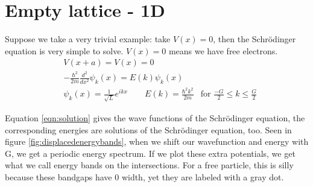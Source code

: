 \section{Empty lattice - 1D}
Suppose we take a very trivial example: take $V(x) = 0$, then the Schrödinger equation is very simple to solve. $V(x) = 0$ means we have free electrons.
\begin{align}
    &V(x+a) = V(x) = 0\\
    &-\frac{\hbar^2}{2m}\frac{d^2}{dx^2}\psi_k(x) = E(k)\psi_k(x)\\
    &\psi_k(x) = \frac{1}{\sqrt{L}}e^{ikx} \qquad E(k) = \frac{\hbar^2k^2}{2m} & \text{for }\frac{-G}{2} \leq k \leq \frac{G}{2} \label{eqn:solution}
\end{align}

Equation \ref{eqn:solution} gives the wave functions of the Schrödinger equation, the corresponding energies are solutions of the Schrödinger equation, too. Seen in figure \ref{fig:displacedenergybands}, when we shift our wavefunction and energy with G, we get a periodic energy spectrum. If we plot these extra potentials, we get what we call energy bands on the intersections. For a free particle, this is silly because these bandgaps have $0$ width, yet they are labeled with a gray dot.

